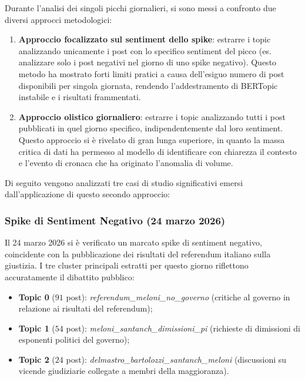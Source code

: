 \documentclass[11pt]{article}
\begin{document}
Durante l'analisi dei singoli picchi giornalieri, si sono messi a confronto due diversi approcci metodologici:
\begin{enumerate}
    \item \textbf{Approccio focalizzato sul sentiment dello spike}: estrarre i topic analizzando unicamente i post con lo specifico sentiment del picco (es. analizzare solo i post negativi nel giorno di uno spike negativo). Questo metodo ha mostrato forti limiti pratici a causa dell'esiguo numero di post disponibili per singola giornata, rendendo l'addestramento di BERTopic instabile e i risultati frammentati.
    \item \textbf{Approccio olistico giornaliero}: estrarre i topic analizzando tutti i post pubblicati in quel giorno specifico, indipendentemente dal loro sentiment. Questo approccio si è rivelato di gran lunga superiore, in quanto la massa critica di dati ha permesso al modello di identificare con chiarezza il contesto e l'evento di cronaca che ha originato l'anomalia di volume.
\end{enumerate}

Di seguito vengono analizzati tre casi di studio significativi emersi dall'applicazione di questo secondo approccio:

\subsubsection{Spike di Sentiment Negativo (24 marzo 2026)}
Il 24 marzo 2026 si è verificato un marcato spike di sentiment negativo, coincidente con la pubblicazione dei risultati del referendum italiano sulla giustizia. I tre cluster principali estratti per questo giorno riflettono accuratamente il dibattito pubblico:
\begin{itemize}
    \item \textbf{Topic 0} ($91$ post): \textit{referendum\_meloni\_no\_governo} (critiche al governo in relazione ai risultati del referendum);
    \item \textbf{Topic 1} ($54$ post): \textit{meloni\_santanch\_dimissioni\_pi} (richieste di dimissioni di esponenti politici del governo);
    \item \textbf{Topic 2} ($24$ post): \textit{delmastro\_bartolozzi\_santanch\_meloni} (discussioni su vicende giudiziarie collegate a membri della maggioranza).
\end{itemize}
\end{document}
